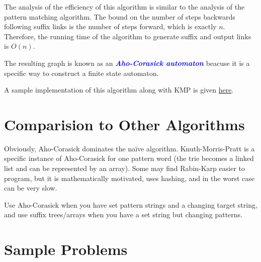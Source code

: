 \documentclass[11pt, oneside]{article}
\newcommand{\emphasis}[1]{\textcolor{blue}{\textbf{\textit{#1}}}}
\begin{document}
The analysis of the efficiency of this algorithm is similar to the analysis of the pattern matching algorithm.
The bound on the number of steps backwards following suffix links is the number of steps forward, which is exactly \( n \).
Therefore, the running time of the algorithm to generate suffix and output links is \( O(n) \).

The resulting graph is known as an \emphasis{Aho-Corasick automaton} beacuse it is a specific way to construct
a finite state automaton.

A sample implementation of this algorithm along with KMP is given \href{https://gist.github.com/stephen-huan/aa609965c86d750736398c28b025f9be#matching}{here}.

\section{Comparision to Other Algorithms}

Obviously, Aho-Corasick dominates the naïve algorithm. Knuth-Morris-Pratt is a specific instance of
Aho-Corasick for one pattern word (the trie becomes a linked list and can be represented by an array).
Some may find Rabin-Karp easier to program, but it is mathematically motivated, uses hashing,
and in the worst case can be very slow.

Use Aho-Corasick when you have set pattern strings and a changing target string,
and use suffix trees/arrays when you have a set string but changing patterns.

\newpage

\section{Sample Problems}
\end{document}
